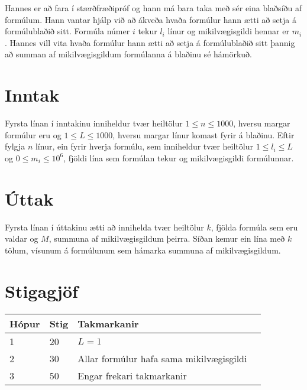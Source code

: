 Hannes er að fara í stærðfræðipróf og hann má bara taka með sér eina blaðsíðu af formúlum. Hann vantar
hjálp við að ákveða hvaða formúlur hann ætti að setja á formúlublaðið sitt. Formúla númer $i$ tekur $l_i$ línur
og mikilvægisgildi hennar er $m_i$. Hannes vill vita hvaða formúlur hann ætti að setja á formúlublaðið sitt
þannig að summan af mikilvægisgildum formúlanna á blaðinu sé hámörkuð.

\section*{Inntak}
Fyrsta línan í inntakinu inniheldur tvær heiltölur $1 \leq n \leq 1000$, hversu margar formúlur eru
og $1 \leq L \leq 1000$, hversu margar línur komast fyrir á blaðinu.
Eftir fylgja $n$ línur, ein fyrir hverja formúlu, sem inniheldur tvær heiltölur $1 \leq l_i \leq L$
og $0 \leq m_i \leq 10^6$, fjöldi lína sem formúlan tekur og mikilvægisgildi formúlunnar.

\section*{Úttak}
Fyrsta línan í úttakinu ætti að innihelda tvær heiltölur $k$, fjölda formúla sem eru valdar og $M$, summuna af
mikilvægisgildum þeirra.
Síðan kemur ein lína með $k$ tölum, vísunum á formúlunum sem hámarka summuna af mikilvægisgildum.

\section*{Stigagjöf}
\begin{tabular}{|l|l|l|l|}
\hline
Hópur & Stig & Takmarkanir \\ \hline
1     & 20   & $L = 1$\\ \hline
2     & 30   & Allar formúlur hafa sama mikilvægisgildi\\ \hline
3     & 50   & Engar frekari takmarkanir\\ \hline
\end{tabular}
